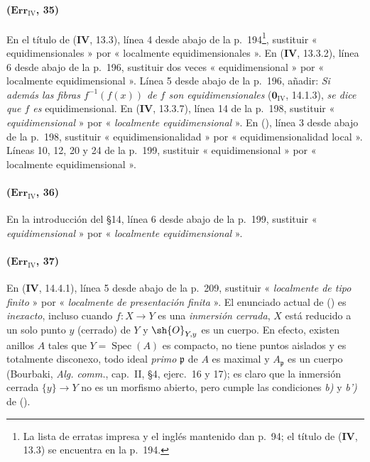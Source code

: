 \paragraph{($\mathbf{Err}_{\mathrm{IV}}$, 35)}
En el título de (\textbf{IV}, 13.3), línea 4 desde abajo de la
p.~194\footnote{La lista de erratas impresa y el inglés mantenido dan
p.~94; el título de (\textbf{IV}, 13.3) se encuentra en la p.~194.}, sustituir
« equidimensionales » por « localmente equidimensionales ». En
(\textbf{IV}, 13.3.2), línea 6 desde abajo de la p.~196, sustituir dos veces
« equidimensional » por « localmente equidimensional ». Línea 5 desde abajo
de la p.~196, añadir: \emph{Si además las fibras $f^{-1}(f(x))$ de
$f$ son equidimensionales} ($\mathbf{0}_{\mathrm{IV}}$, 14.1.3), \emph{se dice que
$f$ es} equidimensional. En (\textbf{IV}, 13.3.7), línea 14 de la p.~198,
sustituir « \emph{equidimensional} » por « \emph{localmente equidimensional} ».
En ({}), línea 3 desde
abajo de la p.~198, sustituir « equidimensionalidad » por
« equidimensionalidad local ». Líneas 10, 12, 20 y 24 de la p.~199,
sustituir « equidimensional » por « localmente equidimensional ».

\paragraph{($\mathbf{Err}_{\mathrm{IV}}$, 36)}
En la introducción del \S14, línea 6 desde abajo de la p.~199, sustituir
« \emph{equidimensional} » por « \emph{localmente equidimensional} ».

\paragraph{($\mathbf{Err}_{\mathrm{IV}}$, 37)}
En (\textbf{IV}, 14.4.1), línea 5 desde abajo de la p.~209, sustituir « \emph{localmente de tipo finito} » por « \emph{localmente de presentación finita} ». El enunciado
actual de ({}) es \emph{inexacto},
incluso cuando $f:X\to Y$ es una \emph{inmersión cerrada}, $X$ está reducido a
un solo punto $y$ (cerrado) de $Y$ y $\sh{O}_{Y,y}$ es un cuerpo. En
efecto, existen anillos $A$ tales que $Y=\operatorname{Spec}(A)$ es
compacto, no tiene puntos aislados y es totalmente disconexo, todo ideal \emph{primo}
$\mathfrak p$ de $A$ es maximal y $A_\mathfrak p$ es un cuerpo
(Bourbaki, \emph{Alg. comm.}, cap.~II, \S4, ejerc.~16 y 17); es
claro que la inmersión cerrada $\{y\}\to Y$ no es un morfismo
abierto, pero cumple las condiciones \emph{b)} y \emph{b')} de
({}).

